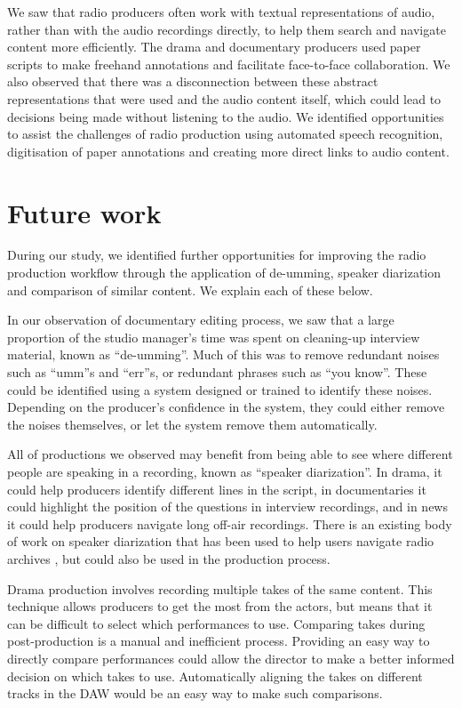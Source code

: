 We saw that radio producers often work with textual representations of audio, rather than with the audio recordings
directly, to help them search and navigate content more efficiently.  The drama and documentary producers used paper
scripts to make freehand annotations and facilitate face-to-face collaboration. We also observed that there was a
disconnection between these abstract representations that were used and the audio content itself, which could lead to
decisions being made without listening to the audio.  We identified opportunities to assist the challenges of radio
production using automated speech recognition, digitisation of paper annotations and creating more direct links to
audio content.

\section{Future work}\label{sec:ethno-future}
During our study, we identified further opportunities for improving the radio production workflow through the
application of de-umming, speaker diarization and comparison of similar content. We explain each of these below.

In our observation of documentary editing process, we saw that a large proportion of the studio manager's time was
spent on cleaning-up interview material, known as ``de-umming''. Much of this was to remove redundant noises such as
``umm''s and ``err''s, or redundant phrases such as ``you know''. These could be identified using a system designed or
trained to identify these noises.  Depending on the producer's confidence in the system, they could either remove
the noises themselves, or let the system remove them automatically.

All of productions we observed may benefit from being able to see where different people are speaking in a recording,
known as ``speaker diarization''. In drama, it could help producers identify different lines in the script, in
documentaries it could highlight the position of the questions in interview recordings, and in news it could help
producers navigate long off-air recordings. There is an existing body of work on speaker diarization
\citep{AngueraMiro2012} that has been used to help users navigate radio archives \citep{Raimond2014}, but could also be
used in the production process.

Drama production involves recording multiple takes of the same content. This technique allows producers to get the most
from the actors, but means that it can be difficult to select which performances to use.  Comparing takes during
post-production is a manual and inefficient process.  Providing an easy way to directly compare performances could
allow the director to make a better informed decision on which takes to use. Automatically aligning the takes on
different tracks in the DAW would be an easy way to make such comparisons.

